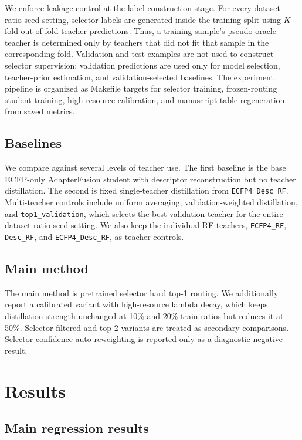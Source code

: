 \documentclass[11pt]{article}
\begin{document}
We enforce leakage control at the label-construction stage. For every
dataset-ratio-seed setting, selector labels are generated inside the training
split using \(K\)-fold out-of-fold teacher predictions. Thus, a training sample's
pseudo-oracle teacher is determined only by teachers that did not fit that
sample in the corresponding fold. Validation and test examples are not used to
construct selector supervision; validation predictions are used only for model
selection, teacher-prior estimation, and validation-selected baselines.
The experiment pipeline is organized as Makefile targets for selector training,
frozen-routing student training, high-resource calibration, and manuscript table
regeneration from saved metrics.

\subsection{Baselines}

We compare against several levels of teacher use. The first baseline is the
base ECFP-only AdapterFusion student with descriptor reconstruction but no
teacher distillation. The second is fixed single-teacher distillation from
\texttt{ECFP4\_Desc\_RF}. Multi-teacher controls include uniform averaging,
validation-weighted distillation, and \texttt{top1\_validation}, which selects
the best validation teacher for the entire dataset-ratio-seed setting. We also
keep the individual RF teachers, \texttt{ECFP4\_RF}, \texttt{Desc\_RF}, and
\texttt{ECFP4\_Desc\_RF}, as teacher controls.

\subsection{Main method}

The main method is pretrained selector hard top-1 routing. We additionally
report a calibrated variant with high-resource lambda decay, which keeps
distillation strength unchanged at 10\% and 20\% train ratios but reduces it
at 50\%. Selector-filtered and top-2 variants are treated as secondary
comparisons. Selector-confidence auto reweighting is reported only as a
diagnostic negative result.

\section{Results}

\subsection{Main regression results}
\end{document}
